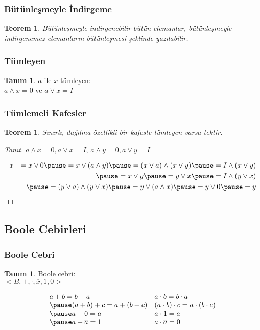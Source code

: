 \documentclass[dvipsnames]{beamer}
\theoremstyle{definition}
\newtheorem{tanim}[theorem]{Tanım}
\theoremstyle{example}
\theoremstyle{plain}
\newtheorem{teorem}[theorem]{Teorem}
\begin{document}
\begin{frame}
  \frametitle{Bütünleşmeyle İndirgeme}

  \begin{teorem}
    Bütünleşmeyle indirgenebilir bütün elemanlar, bütünleşmeyle indirgenemez
    elemanların bütünleşmesi şeklinde yazılabilir.
  \end{teorem}
\end{frame}

\begin{frame}
  \frametitle{Tümleyen}

  \begin{tanim}
    $a$ ile $x$ \alert{tümleyen}:\\
    $a \wedge x = 0$ ve $a \vee x = I$
  \end{tanim}
\end{frame}

\begin{frame}
  \frametitle{Tümlemeli Kafesler}

  \begin{teorem}
    Sınırlı, dağılma özellikli bir kafeste tümleyen varsa tektir.
  \end{teorem}

  \pause
  \begin{proof}[Tanıt]
    $a \wedge x = 0, a \vee x = I$, $a \wedge y = 0, a \vee y = I$

    \pause
    \medskip
    \begin{eqnarray*}
  & x & = x \vee 0 \pause = x \vee (a \wedge y) \pause = (x \vee a) \wedge (x \vee y) \pause = I \wedge (x \vee y)\\
  &   & \pause = x \vee y \pause = y \vee x \pause = I \wedge (y \vee x)\\
  &   & \pause = (y \vee a) \wedge (y \vee x) \pause = y \vee (a \wedge x) \pause = y \vee 0 \pause = y\\
    \end{eqnarray*}
  \end{proof}
\end{frame}

\subsection{Boole Cebirleri}

\begin{frame}
  \frametitle{Boole Cebri}

  \begin{tanim}
    \alert{Boole cebri}:\\
    $<B,+,\cdot,\overline{x},1,0>$

    \pause
    \[\begin{array}{ll}
      a + b = b + a &
      a \cdot b = b \cdot a\\ \pause
      (a + b) + c = a + (b + c) &
      (a \cdot b) \cdot c = a \cdot (b \cdot c)\\ \pause
      a + 0 = a &
      a \cdot 1 = a\\ \pause
      a + \overline{a} = 1 &
      a \cdot \overline{a} = 0
    \end{array}\]
  \end{tanim}
\end{frame}
\end{document}
